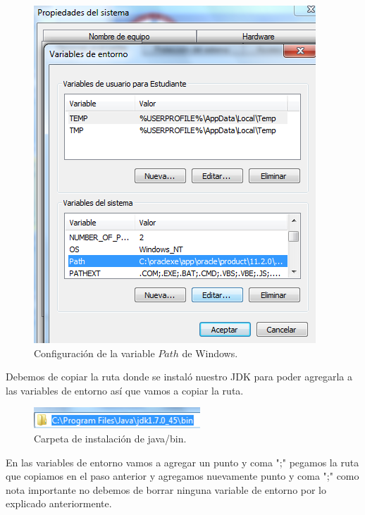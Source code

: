 \begin{figure}[H]
	\begin{center}
		\includegraphics[scale=.4]{images/instalaciones/java/img_java_12}
		\caption{Configuración de la variable $Path$ de Windows.}
	\end{center}
\end{figure}

Debemos de copiar la ruta donde se
instaló nuestro JDK para poder agregarla a las variables de entorno así que
vamos a copiar la ruta.

\begin{figure}[H]
	\begin{center}
		\includegraphics[scale=.4]{images/instalaciones/java/img_java_13}
		\caption{Carpeta de instalación de java/bin.}
	\end{center}
\end{figure}

En las variables de entorno vamos a
agregar un punto y coma ";" pegamos la ruta que copiamos en el paso anterior y
agregamos nuevamente punto y coma ";" como nota importante no debemos de borrar
ninguna variable de entorno por lo explicado anteriormente.    

